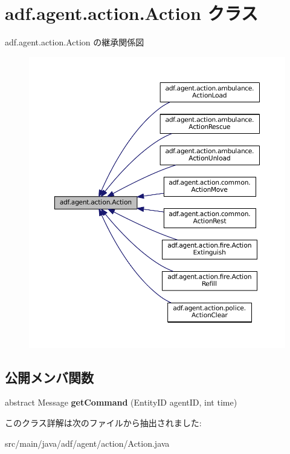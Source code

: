 \hypertarget{classadf_1_1agent_1_1action_1_1Action}{}\section{adf.\+agent.\+action.\+Action クラス}
\label{classadf_1_1agent_1_1action_1_1Action}


adf.\+agent.\+action.\+Action の継承関係図
\nopagebreak
\begin{figure}[H]
\begin{center}
\leavevmode
\includegraphics[width=350pt]{classadf_1_1agent_1_1action_1_1Action__inherit__graph}
\end{center}
\end{figure}
\subsection*{公開メンバ関数}
\begin{DoxyCompactItemize}
\item 
\hypertarget{classadf_1_1agent_1_1action_1_1Action_afc2cef4d52ee76566ee518bab9d5f145}{}\label{classadf_1_1agent_1_1action_1_1Action_afc2cef4d52ee76566ee518bab9d5f145} 
abstract Message {\bfseries get\+Command} (Entity\+ID agent\+ID, int time)
\end{DoxyCompactItemize}


このクラス詳解は次のファイルから抽出されました\+:\begin{DoxyCompactItemize}
\item 
src/main/java/adf/agent/action/Action.\+java\end{DoxyCompactItemize}
